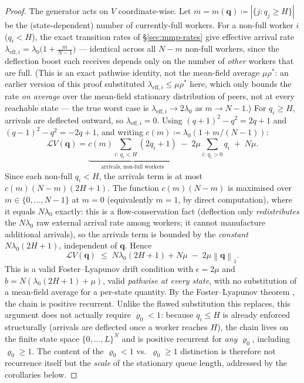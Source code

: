 \documentclass[11pt,a4paper]{report}
\newcommand{\norm}[1]{\left\lVert #1 \right\rVert}
\newcommand{\rhostar}{\rho^{*}}
\newcommand{\rhozero}{\varrho_0}
\newcommand{\generator}{\mathcal{L}}
\begin{document}
\begin{proof}
The generator acts on $V$ coordinate-wise. Let $m = m(\mathbf{q})
\coloneqq |\{j : q_j \geq H\}|$ be the (state-dependent) number of
currently-full workers. For a non-full worker $i$ ($q_i<H$), the exact
transition rates of \S\ref{sec:mmp-rates} give effective arrival rate
$\lambda_{\mathrm{eff},i} = \lambda_0\bigl(1 + \tfrac{m}{N-1}\bigr)$
--- identical across all $N-m$ non-full workers, since the deflection
boost each receives depends only on the number of \emph{other} workers
that are full. (This is an exact pathwise identity, not the mean-field
average $\mu\rhostar$: an earlier version of this proof substituted
$\lambda_{\mathrm{eff},i}\leq\mu\rhostar$ here, which only bounds the
rate \emph{on average} over the mean-field stationary distribution of
peers, not at every reachable state --- the true worst case is
$\lambda_{\mathrm{eff},i} \to 2\lambda_0$ as $m\to N-1$.) For $q_i \geq
H$, arrivals are deflected outward, so $\lambda_{\mathrm{eff},i} = 0$.
Using $(q+1)^2-q^2=2q+1$ and $(q-1)^2-q^2=-2q+1$, and writing
$c(m) \coloneqq \lambda_0(1+m/(N-1))$:
\[
  \generator V(\mathbf{q})
  = \underbrace{c(m)\!\!\sum_{i:\,q_i<H}\!\!(2q_i+1)}_{\text{arrivals, non-full workers}}
  \;-\; 2\mu\!\!\sum_{i:\,q_i>0}\!\!q_i \;+\; N\mu.
\]
Since each non-full $q_i < H$, the arrivals term is at most
$c(m)(N-m)(2H+1)$. The function $c(m)(N-m)$ is maximised over
$m\in\{0,\ldots,N-1\}$ at $m=0$ (equivalently $m=1$, by direct
computation), where it equals $N\lambda_0$ exactly: this is a flow-conservation
fact (deflection only \emph{redistributes} the $N\lambda_0$ raw external
arrival rate among workers; it cannot manufacture additional arrivals),
so the arrivals term is bounded by the \emph{constant}
$N\lambda_0(2H+1)$, independent of $\mathbf{q}$. Hence
\[
  \generator V(\mathbf{q})
  \;\leq\; N\lambda_0(2H+1) + N\mu \;-\; 2\mu\norm{\mathbf{q}}_1.
  \label{eq:perworker-drift}
\]
This is a valid Foster--Lyapunov drift condition with $\epsilon=2\mu$
and $b = N(\lambda_0(2H+1)+\mu)$, valid \emph{pathwise at every state},
with no substitution of a mean-field average for a per-state quantity.
By the Foster--Lyapunov theorem \cite{meyn2009}, the chain is positive
recurrent. Unlike the flawed substitution this replaces, this argument
does not actually require $\rhozero<1$: because $q_i\le H$ is already
enforced structurally (arrivals are deflected once a worker reaches
$H$), the chain lives on the finite state space $\{0,\ldots,L\}^N$ and
is positive recurrent for \emph{any} $\rhozero$, including
$\rhozero\geq 1$. The content of the $\rhozero<1$ vs.\ $\rhozero\geq 1$
distinction is therefore not recurrence itself but the \emph{scale} of
the stationary queue length, addressed by the corollaries below.
\end{proof}
\end{document}
